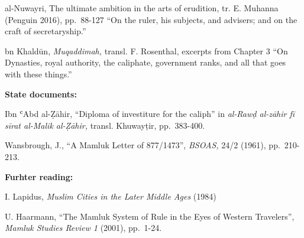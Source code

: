 \documentclass[
]{book}
\begin{document}
al-Nuwayri, The ultimate ambition in the arts of erudition, tr. E. Muhanna (Penguin 2016), pp.~88-127 ``On the ruler, his subjects, and advisers; and on the craft of secretaryship.''

bn Khaldūn, \emph{Muqaddimah,} transl. F. Rosenthal, excerpts from Chapter 3 ``On Dynasties, royal authority, the caliphate, government ranks, and all that goes with these things.''

\textbf{State documents:}

Ibn ʿAbd al-Ẓāhir, ``Diploma of investiture for the caliph'' in \emph{al-Rawḍ al-zāhir fī sīrat al-Malik al-Ẓāhir,} transl. Khuwayṭir, pp.~383-400.

Wansbrough, J., ``A Mamluk Letter of 877/1473'', \emph{BSOAS,} 24/2 (1961), pp.~210-213.

\textbf{Furhter reading:}

I. Lapidus, \emph{Muslim Cities in the Later Middle Ages} (1984)

U. Haarmann, ``The Mamluk System of Rule in the Eyes of Western Travelers'', \emph{Mamluk Studies Review 1} (2001), pp.~1-24.

  
\end{document}
